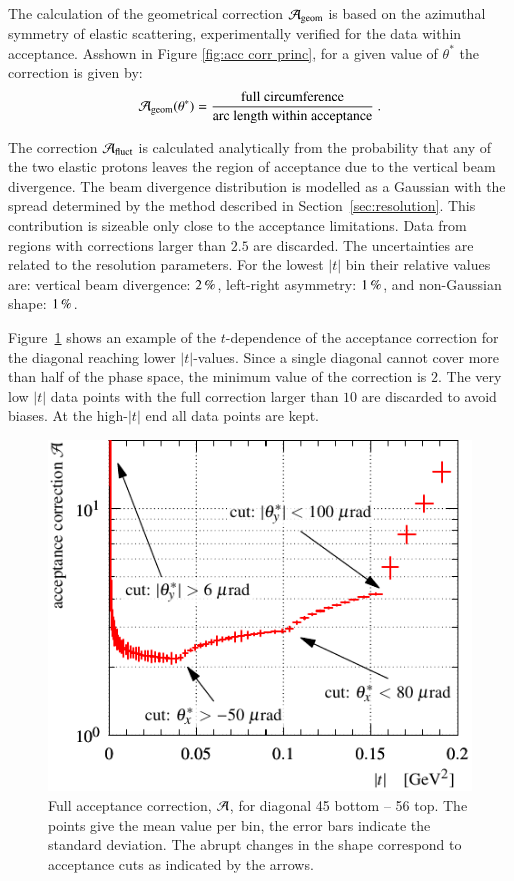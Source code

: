The calculation of the geometrical correction ${\cal A}_{\rm geom}$ is based on the azimuthal symmetry of elastic scattering, experimentally verified for the data within acceptance. As\Break shown in Figure \ref{fig:acc corr princ}, for a given value of $\theta^*$ the correction is given by:
\begin{equation}
\label{eq:acc geom}
{\cal A_{\rm geom}}(\theta^*) = {
	\hbox{full circumference}\over 
	\hbox{arc length within acceptance}
} \ .
\end{equation}

The correction ${\cal A}_{\rm fluct}$ is calculated analytically from the probability that any of the two elastic protons leaves the region of acceptance due to the vertical beam divergence. The beam divergence distribution is modelled as a Gaussian with the spread determined by the method described in Section~\ref{sec:resolution}. This contribution is sizeable only close to the acceptance limitations. Data from regions with corrections larger than $2.5$ are discarded. The uncertainties are related to the resolution parameters. For the lowest $|t|$ bin their relative values are: vertical beam divergence: $2\,{\rm \%}$, left-right asymmetry: $1\,{\rm \%}$, and non-Gaussian shape: $1\,{\rm \%}$.

Figure~\ref{fig:acc corr res} shows an example of the $t$-dependence of the acceptance correction for the diagonal reaching lower $|t|$-values. Since a single diagonal cannot cover more than half of the phase space, the minimum value of the correction is $2$. The very low $|t|$ data points with the full correction larger than $10$ are discarded to avoid biases. At the high-$|t|$ end all data points are kept.

\begin{figure}
\begin{center}
\includegraphics{fig/acc_corr_hist_lab.pdf}
\caption{%
Full acceptance correction, ${\cal A}$, for diagonal 45 bottom -- 56 top. The points give the mean value per bin, the error bars indicate the standard deviation. The abrupt changes in the shape correspond to acceptance cuts as indicated by the arrows.
}
\label{fig:acc corr res}
\end{center}
\end{figure}


